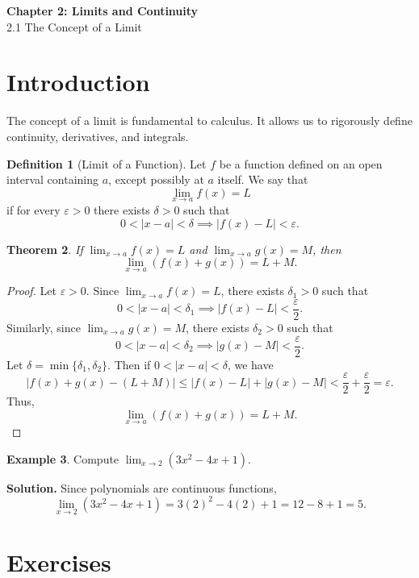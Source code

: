 \documentclass[12pt]{article}
\newtheorem{theorem}{Theorem}[section]
\theoremstyle{definition}
\newtheorem{definition}[theorem]{Definition}
\newtheorem{example}[theorem]{Example}
\begin{document}
\begin{center}
    {\Large \textbf{Chapter 2: Limits and Continuity}}\\
    \vspace{0.5em}
    {\large 2.1 The Concept of a Limit}
\end{center}

\section*{Introduction}

The concept of a limit is fundamental to calculus. It allows us to rigorously define
continuity, derivatives, and integrals.

\begin{definition}[Limit of a Function]
Let $f$ be a function defined on an open interval containing $a$, except possibly at $a$ itself.
We say that
\[
\lim_{x \to a} f(x) = L
\]
if for every $\varepsilon > 0$ there exists $\delta > 0$ such that
\[
0 < |x - a| < \delta \implies |f(x) - L| < \varepsilon.
\]
\end{definition}

\begin{theorem}
If $\lim_{x \to a} f(x) = L$ and $\lim_{x \to a} g(x) = M$, then
\[
\lim_{x \to a} (f(x) + g(x)) = L + M.
\]
\end{theorem}

\begin{proof}
Let $\varepsilon > 0$. Since $\lim_{x \to a} f(x) = L$, there exists $\delta_1 > 0$
such that
\[
0 < |x - a| < \delta_1 \implies |f(x) - L| < \frac{\varepsilon}{2}.
\]
Similarly, since $\lim_{x \to a} g(x) = M$, there exists $\delta_2 > 0$
such that
\[
0 < |x - a| < \delta_2 \implies |g(x) - M| < \frac{\varepsilon}{2}.
\]
Let $\delta = \min\{\delta_1, \delta_2\}$. Then if
$0 < |x - a| < \delta$, we have
\[
|f(x) + g(x) - (L + M)|
\le |f(x) - L| + |g(x) - M|
< \frac{\varepsilon}{2} + \frac{\varepsilon}{2}
= \varepsilon.
\]
Thus,
\[
\lim_{x \to a} (f(x) + g(x)) = L + M.
\]
\end{proof}

\begin{example}
Compute $\lim_{x \to 2} (3x^2 - 4x + 1)$.

\textbf{Solution.}
Since polynomials are continuous functions,
\[
\lim_{x \to 2} (3x^2 - 4x + 1)
= 3(2)^2 - 4(2) + 1
= 12 - 8 + 1
= 5.
\]
\end{example}

\section*{Exercises}
\end{document}
